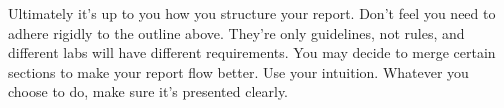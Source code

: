\documentclass[11pt]{extarticle}
\begin{document}
\hfill 

Ultimately it's up to you how you structure your report. Don't feel you need to adhere rigidly to the outline above. They're only guidelines, not rules, and different labs will have different requirements. You may decide to merge certain sections to make your report flow better. Use your intuition. Whatever you choose to do, make sure it's presented clearly. \\ 
\end{document}
